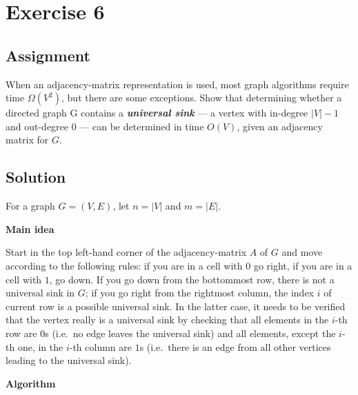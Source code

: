 
\newtheorem{theorem}{Theorem}

\section*{Exercise 6}
\label{sec:Ex6}

\subsection*{Assignment} When an adjacency-matrix representation is used, most
graph algorithms require time $\Omega(V^2)$, but there are some exceptions.
Show that determining whether a directed graph G contains
a \textit{\textbf{universal sink}} --- a vertex with in-degree $|V| - 1$ and
out-degree 0 --- can be determined in time $O(V)$, given an adjacency matrix
for $G$.

\subsection*{Solution}

For a graph $G = (V, E)$, let $n = |V|$ and $m = |E|$.

\textbf{Main idea}

Start in the top left-hand corner of the adjacency-matrix $A$ of $G$ and move
according to the following rules: if you are in a cell with $0$ go right, if
you are in a cell with $1$, go down. If you go down from the bottommost row,
there is not a universal sink in $G$; if you go right from the rightmost
column, the index $i$ of current row is a possible universal sink. In the
latter case, it needs to be verified that the vertex really is a universal sink
by checking that all elements in the $i$-th row are $0$s (i.e.~no edge leaves
the universal sink) and all elements, except the $i$-th one, in the $i$-th
column are $1$s (i.e.~there is an edge from all other vertices leading to the
universal sink).


\textbf{Algorithm}

